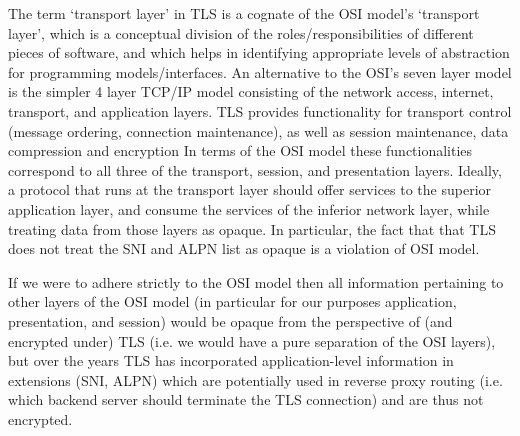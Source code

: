 



The term `transport layer' in \ac{TLS} is a cognate of the \ac{OSI} model's `transport layer', which is a conceptual division of the roles/responsibilities of different pieces of software, and which helps in identifying appropriate levels of abstraction for programming models/interfaces.
An alternative to the \ac{OSI}'s seven layer model is the simpler 4 layer TCP/IP model consisting
of the network access, internet, transport, and application layers.
\ac{TLS} provides functionality for transport control (message ordering, connection maintenance),
as well as session maintenance, data compression and encryption
In terms of the \ac{OSI} model these functionalities correspond to all three of the transport, session, and presentation layers.
Ideally, a protocol that runs at the transport layer should offer services to the superior application layer,
and consume the services of the inferior network layer,
while treating data from those layers as opaque.
In particular, the fact that that \ac{TLS} does not treat the \ac{SNI} and \ac{ALPN} list as opaque is a violation of OSI model.




If we were to adhere strictly to the \ac{OSI} model then all information pertaining to other layers of the \ac{OSI} model (in particular for our purposes application, presentation, and session) would be opaque from the perspective of (and encrypted under) TLS (i.e. we would have a pure separation of the \ac{OSI} layers), but over the years \ac{TLS} has incorporated application-level information in extensions (\ac{SNI}, \ac{ALPN}) which are potentially used in reverse proxy routing (i.e. which
backend server should terminate the \ac{TLS} connection) and are thus not encrypted.

